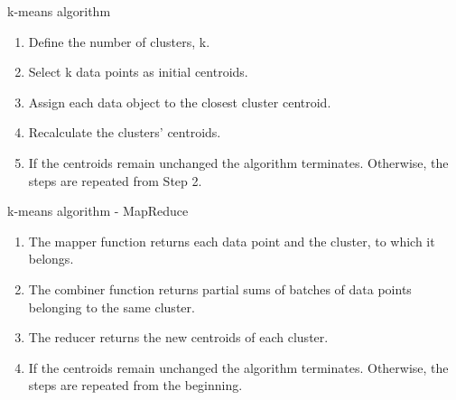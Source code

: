 \documentclass[11pt]{article}
\begin{document}
\begin{algorithm}
	\caption{k-means algorithm}
							
	\begin{enumerate}
		\item Define the number of clusters, k.
		\item Select k data points as initial centroids. 
		\item Assign each data object to the closest cluster centroid.
		\item Recalculate the clusters’ centroids.
		\item  If the centroids remain unchanged the algorithm terminates. Otherwise, the steps are repeated from Step 2.
	\end{enumerate}
\end{algorithm}

\begin{algorithm}
	\caption{k-means algorithm - MapReduce}
							
	\begin{enumerate}
		\item The mapper function returns each data point and the cluster, to which it belongs.
		\item The combiner function returns partial sums of batches of data points belonging to the same cluster. 
		\item The reducer returns the new centroids of each cluster.
		\item If the centroids remain unchanged the algorithm terminates. Otherwise, the steps are repeated from the beginning.
	\end{enumerate}
							
\end{algorithm}
\end{document}
